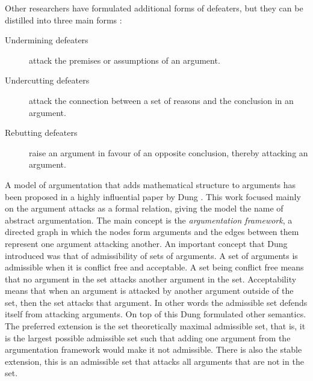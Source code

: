 Other researchers have formulated additional forms of defeaters, but they can
be distilled into three main forms \cite{vaneemeren2014}:
\begin{description}
	\item[Undermining defeaters] attack the premises or assumptions of an
	argument.
	\item[Undercutting defeaters] attack the connection between a set of
	reasons and the conclusion in an argument.
	\item[Rebutting defeaters] raise an argument in favour of an opposite
	conclusion, thereby attacking an argument.
\end{description}

A model of argumentation that adds mathematical structure to arguments has been
proposed in a highly influential paper by Dung \cite{dung1995}.
This work focused mainly on the argument attacks as a formal relation, giving
the model the name of abstract argumentation. The main concept is the
\emph{argumentation framework}, a directed graph in which the nodes form
arguments and the edges between them represent one argument attacking another.
An important concept that Dung introduced was that of admissibility of sets of
arguments. A set of arguments is admissible when it is conflict free and
acceptable. A set being conflict free means that no argument in the set attacks
another argument in the set. Acceptability means that when an argument is
attacked by another argument outside of the set, then the set attacks that
argument. In other words the admissible set defends itself from attacking
arguments. On top of this Dung formulated other semantics. The preferred
extension is the set theoretically maximal admissible set, that is, it is the
largest possible admissible set such that adding one argument from the
argumentation framework would make it not admissible. There is also the stable
extension, this is an admissible set that attacks all arguments that are not in
the set.


